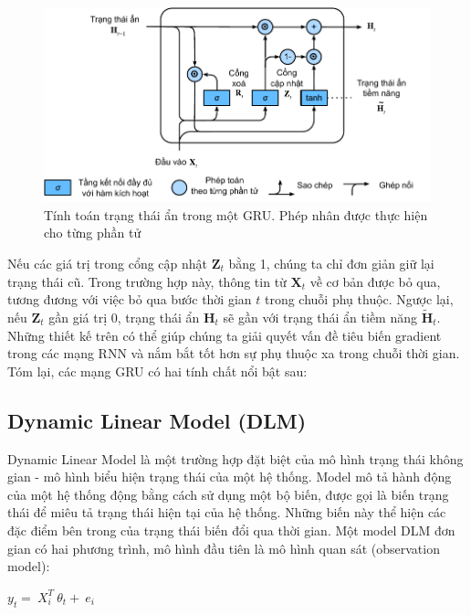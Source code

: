 \documentclass[conference]{IEEEtran}
\begin{document}
\begin{figure}[H]
    \centering
    \begin{minipage}{0.43\textwidth}
        \centering
        \includegraphics[width=1\textwidth]{bibliography/figure/GRU/gru_3.pdf}
        \caption{Tính toán trạng thái ẩn trong một GRU. Phép nhân được thực hiện cho từng phần tử}
        \label{fig:gru_up}
    \end{minipage}

\end{figure}

Nếu các giá trị trong cổng cập nhật $\mathbf{Z}_t$ bằng 1, chúng ta chỉ đơn giản giữ lại trạng thái cũ. Trong trường hợp này, thông tin từ $\mathbf{X}_t$ về cơ bản được bỏ qua, tương đương với việc bỏ qua bước thời gian $t$ trong chuỗi phụ thuộc. Ngược lại, nếu $\mathbf{Z}_t$ gần giá trị 0, trạng thái ẩn $\mathbf{H}_t$ sẽ gần với trạng thái ẩn tiềm năng $\tilde{\mathbf{H}}_t$. Những thiết kế trên có thể giúp chúng ta giải quyết vấn đề tiêu biến gradient trong các mạng RNN và nắm bắt tốt hơn sự phụ thuộc xa trong chuỗi thời gian. Tóm lại, các mạng GRU có hai tính chất nổi bật sau:

\subsection{Dynamic Linear Model (DLM)}
Dynamic Linear Model là một trường hợp đặt biệt của mô hình trạng thái không gian - mô hình biểu hiện trạng thái của một hệ thống. Model mô tả hành động của một hệ thống động bằng cách sử dụng một bộ biến, được gọi là biến trạng thái để miêu tả trạng thái hiện tại của hệ thống. Những biến này thể hiện các đặc điểm bên trong của trạng thái biến đổi qua thời gian.
Một model DLM đơn gian có hai phương trình, mô hình đầu tiên là mô hình quan sát (observation model):
\begin{center}

    \(y_t=\ X_i^T\ \theta_t+\ e_i\)

\end{center}
\end{document}
